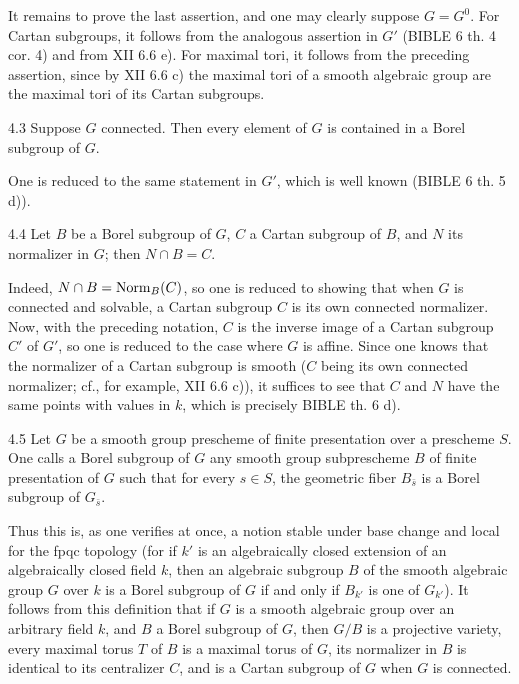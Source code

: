 It remains to prove the last assertion, and one may clearly suppose
$G=G^0$. For Cartan subgroups, it follows from the analogous assertion
in $G'$ (BIBLE 6 th. 4 cor. 4) and from XII 6.6 e). For maximal tori,
it follows from the preceding assertion, since by XII 6.6 c) the
maximal tori of a smooth algebraic group are the maximal tori of
its Cartan subgroups.

\begin{corollary}{4.3}\label{XIV.4.3}
Suppose $G$ connected. Then every element of $G$ is contained in a
Borel subgroup of $G$.
\end{corollary}
One is reduced to the same statement in $G'$, which is well known
(BIBLE 6 th. 5 d)).

\begin{corollary}{4.4}\label{XIV.4.4}
Let $B$ be a Borel subgroup of $G$, $C$ a Cartan subgroup of $B$,
and $N$ its normalizer in $G$; then $N\cap B=C$.
\end{corollary}
Indeed, $N\cap B=\operatorname{Norm}_B(C)$, so one is reduced to showing that
when $G$ is connected and solvable, a Cartan subgroup $C$ is its
own connected normalizer. Now, with the preceding notation,
$C$ is the inverse image of a Cartan subgroup $C'$ of $G'$, so
one is reduced to the case where $G$ is affine. Since one knows
that the normalizer of a Cartan subgroup is smooth ($C$ being
its own connected normalizer; cf., for example, XII 6.6 c)),
it suffices to see that $C$ and $N$ have the same points with
values in $k$, which is precisely BIBLE th. 6 d).

\begin{definition}{4.5}\label{XIV.4.5}
Let $G$ be a smooth group prescheme of finite presentation over
a prescheme $S$. One calls a Borel subgroup of $G$ any smooth
group subprescheme $B$ of finite presentation of $G$ such that
for every $s\in S$, the geometric fiber $B_{\bar s}$ is a Borel
subgroup of $G_{\bar s}$.
\end{definition}
Thus this is, as one verifies at once, a notion stable under
base change and local for the fpqc topology (for if $k'$ is
an algebraically closed extension of an algebraically closed
field $k$, then an algebraic subgroup $B$ of the smooth
algebraic group $G$ over $k$ is a Borel subgroup of $G$ if
and only if $B_{k'}$ is one of $G_{k'}$). It follows from this
definition that if $G$ is a smooth algebraic group over an
arbitrary field $k$, and $B$ a Borel subgroup of $G$, then
$G/B$ is a projective variety, every maximal torus $T$ of
$B$ is a maximal torus of $G$, its normalizer in $B$ is
identical to its centralizer $C$, and is a Cartan subgroup
of $G$ when $G$ is connected.

